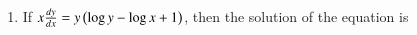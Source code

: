 \documentclass[journal]{IEEEtran}
\begin{document}
\begin{enumerate}
	\item If $x\frac{dy}{dx}=y\left(\log y - \log x +1\right)$, then the solution of the equation is 
		\hfill{}
		\begin{enumerate}
		\end{enumerate}
\end{enumerate}
\end{document}
